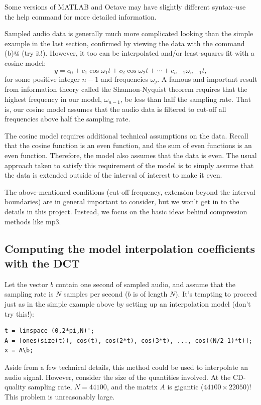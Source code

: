 \documentclass[10pt]{article}
\begin{document}
Some versions of MATLAB and Octave may have slightly different syntax--use the
help command for more detailed information. 
 
Sampled audio data is generally much more complicated looking than the simple
example in the last section, confirmed by viewing the data with the command
\verb@plot(b)@ (try it!). However, it too can be interpolated and/or
least-squares fit with a cosine model:
\[
y = c_0 + c_1\cos\omega_1t + c_2\cos\omega_2t + \cdots + c_{n-1}\omega_{n-1}t,
\]
for some positive integer $n-1$ and frequencies ${\omega_j}$.  A famous and
important result from information theory called the Shannon-Nyquist theorem
requires that the highest frequency in our model, $\omega_{n - 1}$,  be less
than half the sampling rate. That is, our cosine model assumes that the audio
data is filtered to cut-off all frequencies above half the sampling rate. 

The cosine model requires additional technical assumptions on the data.  Recall
that the cosine function is an even function, and the sum of even functions is
an even function. Therefore, the model also assumes that the data is even. The
usual approach taken to satisfy this requirement of the model is to simply
assume that the data is extended outside of the interval of interest to make it
even.

The above-mentioned conditions (cut-off frequency, extension beyond the
interval boundaries) are in general important to consider, but we won't get in
to the details in this project.  Instead, we focus on the basic ideas behind
compression methods like mp3. 

\subsection*{Computing the model interpolation coefficients with the DCT}

Let the vector $b$ contain one second of sampled audio, and assume that the
sampling rate is $N$ samples per second ($b$ is of length $N$).  It's tempting
to proceed just as in the simple example above by setting up an interpolation
model  (don't try this!):

\begin{verbatim}
t = linspace (0,2*pi,N)';
A = [ones(size(t)), cos(t), cos(2*t), cos(3*t), ..., cos((N/2-1)*t)];
x = A\b;
\end{verbatim}
Aside from a few technical details, this method could be used to interpolate
an audio signal. However, consider the size of the quantities involved.
At the CD-quality sampling rate, $N=44100$, and the matrix $A$ is
gigantic ($44100\times 22050$)!  This problem is unreasonably large.
\end{document}
